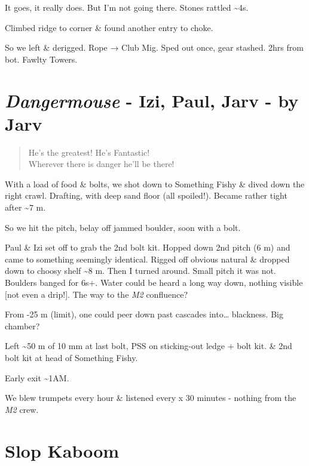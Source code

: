 It goes, it really does. But I'm not going there. Stones rattled
\textasciitilde{}4s.

Climbed ridge to corner \& found another entry to choke.

So we left \& derigged. Rope → Club Mig. Sped out once, gear stashed.
2hrs from bot. Fawlty Towers.


\hypertarget{dangermouse---izi-paul-jarv---by-jarv}{%
\section{\texorpdfstring{\emph{Dangermouse} - Izi, Paul, Jarv - by
Jarv}{Dangermouse - Izi, Paul, Jarv - by Jarv}}\label{dangermouse---izi-paul-jarv---by-jarv}}

\begin{verse}
He's the greatest! He's Fantastic!\\
Wherever there is danger he'll be there!
\end{verse}

With a load of food \& bolts, we shot down to Something Fishy \& dived
down the right crawl. Drafting, with deep sand floor (all spoiled!).
Became rather tight after \textasciitilde{}7 m.

So we hit the pitch, belay off jammed boulder, soon with a bolt.

Paul \& Izi set off to grab the 2nd bolt kit. Hopped down 2nd pitch (6
m) and came to something seemingly identical. Rigged off obvious natural
\& dropped down to choosy shelf \textasciitilde{}8 m. Then I turned
around. Small pitch it was not. Boulders banged for 6s+. Water could be
heard a long way down, nothing visible {[}not even a drip!{]}. The way
to the \emph{M2} confluence?

From -25 m (limit), one could peer down past cascades into\ldots{}
blackness. Big chamber?

Left \textasciitilde{}50 m of 10 mm at last bolt, PSS on sticking-out
ledge + bolt kit. \& 2nd bolt kit at head of Something Fishy.

Early exit \textasciitilde{}1AM.

We blew trumpets every hour \& listened every x 30 minutes - nothing
from the \emph{M2} crew.


\hypertarget{slop-kaboom}{%
\section{Slop Kaboom}\label{slop-kaboom}}

